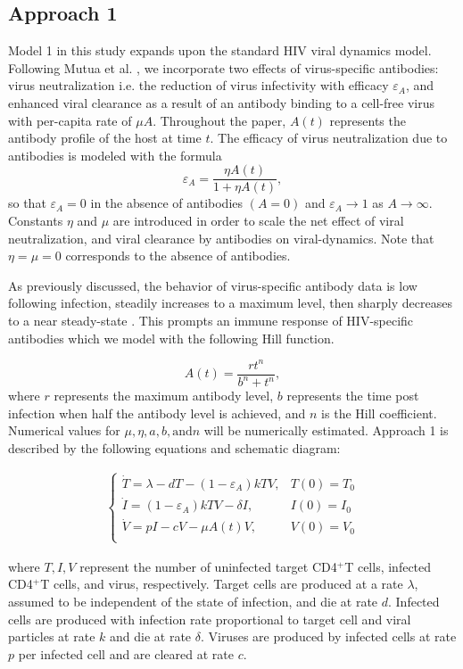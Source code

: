 \documentclass[]{elsarticle}
\theoremstyle{definition}
\begin{document}
\subsection{Approach 1}
Model 1 in this study expands upon the standard HIV viral dynamics model. Following Mutua et al. \cite{pmid30931971}, we incorporate two effects of virus-specific antibodies: virus neutralization i.e. the reduction of virus infectivity with efficacy $\varepsilon_A$, and enhanced viral clearance as a result of an antibody binding to a cell-free virus with per-capita rate of $\mu A$. Throughout the paper, $A(t)$ represents the antibody profile of the host at time $t$. The efficacy of virus neutralization due to antibodies is modeled with the formula
$$\varepsilon_A = \frac{\eta A(t)}{1+\eta A(t)},$$
so that $\varepsilon_A=0$ in the absence of antibodies $(A = 0)$ and $\varepsilon_A \to 1$ as $A \to \infty$. Constants $\eta$ and $\mu$ are introduced in order to scale the net effect of viral neutralization, and viral clearance by antibodies on viral-dynamics. Note that $\eta = \mu = 0$ corresponds to the absence of antibodies.

As previously discussed, the behavior of virus-specific antibody data is low following infection, steadily increases to a maximum level, then sharply decreases to a near steady-state \cite{Stafford2000}. This prompts an immune response of HIV-specific antibodies which we model with the following Hill function.

$$A(t) = \frac{rt^n}{b^n+t^n},$$
where $r$ represents the maximum antibody level, $b$ represents the time post infection when half the antibody level is achieved, and $n$ is the Hill coefficient. Numerical values for $\mu,\eta, a,b, \text{and} n$ will be numerically estimated. Approach 1 is described by the following equations and schematic diagram:

	\begin{align}
	    \label{Approach I}
		\begin{cases}
			\dot{T} = \lambda-dT-(1-\varepsilon_A)kTV, &T(0) = T_0\\
			\dot{I} = (1-\varepsilon_A)kTV-\delta I, &I(0) = I_0\\
			\dot{V} = pI-cV-\mu A(t)V, &V(0) = V_0\\
		\end{cases}
	\end{align}

where $T,I,V$ represent the number of uninfected target CD4$^+$T cells, infected CD4$^+$T cells, and
virus, respectively. Target cells are produced at a rate $\lambda$, assumed to be independent of the state of infection, and die at rate $d$. Infected cells are produced with infection rate proportional to target cell and viral particles at rate $k$ and die at rate $\delta$. Viruses are produced by infected cells at rate $p$ per infected cell and are cleared at rate $c$.
\end{document}
